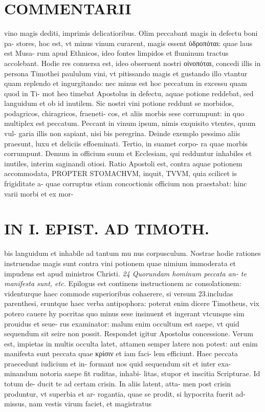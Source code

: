 \documentclass{article}
\begin{document}
\begin{pages}
\section*{COMMENTARII }
\marginpar{[ p.140 ]}\pstart vino magis dediti, imprimis delicatioribus. Olim peccabant magis in defectu boni pa- stores, hoc est, vt minus vinum curarent, magis essent ὑδροπόται: quae laus est Musa- rum apud Ethnicos, ideo fontes limpidos et fluminum tractus accolebant. Hodie res conuersa est, ideo obseruent nostri οἰνοπόται, concedi illis in persona Timothei paululum vini, vt pitissando magis et gustando illo vtantur quam replendo et ingurgitando: nec minus est hoc peccatum in excessu quam quod in Ti- mot heo timebat Apostolus in defectu, aquae potione reddebat, sed languidum et ob id inutilem. Sic nostri vini potione reddunt se morbidos, podagricos, chiragricos, fraeneti- cos, et aliis morbis sese corrumpunt: in quo multiplex est peccatum. Peccant in vinum ipsum, nimis exquisito vtentes, quum vul- garia illis non sapiant, nisi bis peregrina. Deinde exemplo pessimo aliis praesunt, luxu et deliciis effoeminati. Tertio, in suamet corpo- ra quae morbis corrumpunt. Demum in officium suum et Ecclesiam, qui redduntur inhabiles et inutiles, interim saginandi otiosi.  \pend\pstart Ratio Apostoli est, contra aquae potionem accommodata, PROPTER STOMACHVM, inquit, TVVM, quia scilicet is frigiditate a- quae corruptus etiam concoctionis officium non praestabat: hinc varii morbi et ex mor-  \pend
\section*{IN I. EPIST. AD TIMOTH. }
\marginpar{[ p.141 ]}\pstart bis languidum et inhabile ad tantum mu nus corpusculum. Nostrae hodie rationes instruendae magis sunt contra vini potionem quae nimium immoderata et impudens est apud ministros Christi.  \pend
\textit{24 Quorundam hominum peccata an- te manifesta sunt, etc. }\pstart Epilogus est continens instructionem ac consolationem: videnturque haec commode superioribus cohaerere, si versum 23.includas parenthesi, eruntque haec verba antipophora: poterat enim dicere Timotheus, vix potero cauere hy pocritas quo minus sese insinuent et ingerant vtcunque sim prouidus et seue- rus examinator: malum enim occultum est saepe, vt quid sequendum sit seire non possit. Respondet igitur Apostolus concessione. Verum est, impietas in multis occulta latet, attamen semper latere non potest: aut enim manifesta sunt peccata quae κρίσιν et iam faci- lem efficiunt.  \pend\pstart Haec peccata praecedunt iudicium et in- formant nos quid sequendum sit et inter exa- minandum notoria saepe fit ruditas, inhabi- litas, stupor et inscitia Scripturae. Id totum de- ducit te ad certam crisin. In aliis latent, atta- men post crisin produntur, vt superbia et ar- rogantia, quae se prodit, si hypocrita fuerit ad- missus, nam vestis virum faciet, et magistratus  \pend

\end{pages}
\end{document}
